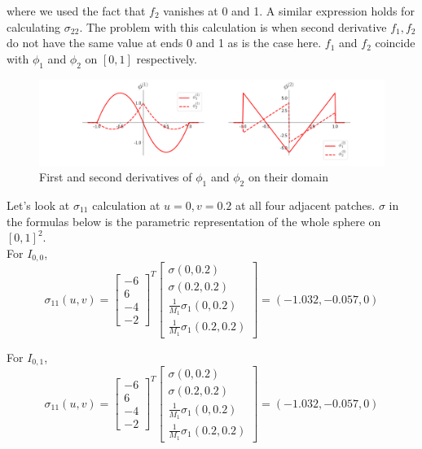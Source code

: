 \documentclass[a4paper, 11pt]{article}
\begin{document}
where we used the fact that $f_2$ vanishes at 0 and 1. A similar expression holds for calculating $\sigma_{22}$. The 
problem with this calculation is when second derivative $f_1, f_2$ do not have the same value at ends 0 and 1 as is the 
case here. $f_1$ and $f_2$ coincide with $\phi_1$ and $\phi_2$ on $[0,1]$ respectively. 

\begin{figure}[h!]
  \includegraphics[width=\textwidth]{hermite_order_2.png}
  \caption{First and second derivatives of $\phi_1$ and $\phi_2$ on their domain}
\end{figure}

Let's look at $\sigma_{11}$ calculation at $u=0, v=0.2$ at all four adjacent patches. $\sigma$ in the formulas below is 
the parametric representation of the whole sphere on ${[0,1]}^2$. \\

For $I_{0,0}$,
\begin{equation*}
\sigma_{11}(u,v) =  \begin{bmatrix} -6 \\ 6 \\ -4 \\ -2 \end{bmatrix}^T
\begin{bmatrix} \sigma(0,0.2)  \\ \sigma(0.2,0.2) \\  \frac{1}{M_1} \sigma_1(0,0.2) \\ \frac{1}{M_1} \sigma_1(0.2,0.2) 
\end{bmatrix} = (-1.032, -0.057, 0)
\end{equation*}

For $I_{0,1}$,
\begin{equation*}
\sigma_{11}(u,v) =  \begin{bmatrix} -6 \\ 6 \\ -4 \\ -2 \end{bmatrix}^T
\begin{bmatrix} \sigma(0,0.2)  \\ \sigma(0.2,0.2) \\  \frac{1}{M_1} \sigma_1(0,0.2) \\ \frac{1}{M_1} \sigma_1(0.2,0.2) 
\end{bmatrix} = (-1.032, -0.057, 0)
\end{equation*}
\end{document}
